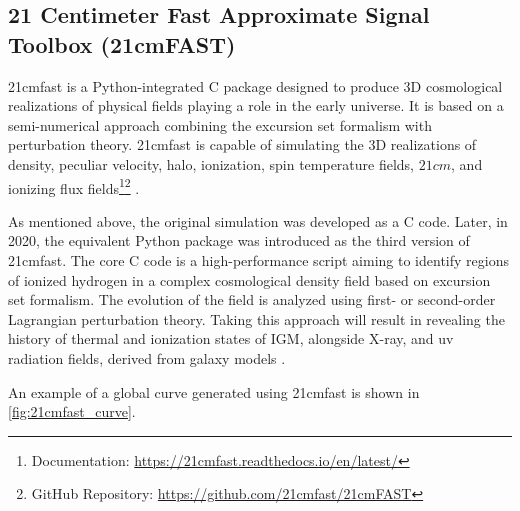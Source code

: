 \documentclass[12pt, TexShade, letterpaper]{report}
\begin{document}
\subsection{21 Centimeter Fast Approximate Signal Toolbox (21cmFAST)}
\gls{21cmfast} is a Python-integrated C package designed to produce 3D cosmological realizations of physical fields playing a role in the early universe. It is based on a semi-numerical approach combining the excursion set formalism with perturbation theory. \gls{21cmfast} is capable of simulating the 3D realizations of density, peculiar velocity, halo, ionization, spin temperature fields, $21cm$, and ionizing flux fields\footnote{Documentation: \hyperlink{https://21cmfast.readthedocs.io/en/latest/}{https://21cmfast.readthedocs.io/en/latest/}}\footnote{GitHub Repository: \hyperlink{https://github.com/21cmfast/21cmFAST}{https://github.com/21cmfast/21cmFAST}} \cite{21cmfast_c, 21cmfast_python}.\par
As mentioned above, the original simulation was developed as a C code. Later, in 2020, the equivalent Python package was introduced as the third version of \gls{21cmfast}. The core C code is a high-performance script aiming to identify regions of ionized hydrogen in a complex cosmological density field based on excursion set formalism. The evolution of the field is analyzed using first- or second-order Lagrangian perturbation theory. Taking this approach will result in revealing the history of thermal and ionization states of IGM, alongside X-ray, and \gls{uv} radiation fields, derived from galaxy models \cite{21cmfast_c}. \par
An example of a global curve generated using \gls{21cmfast} is shown in \ref{fig:21cmfast_curve}.
\end{document}

